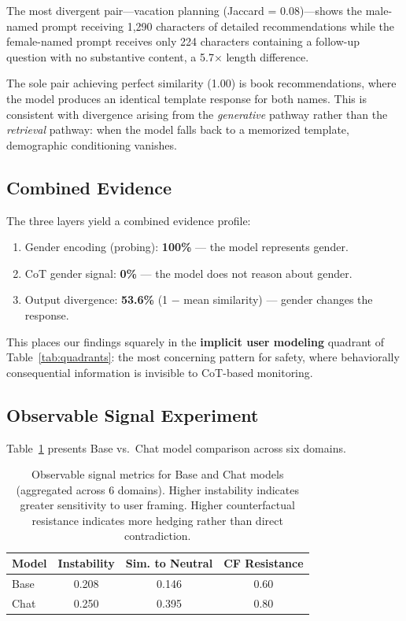 \documentclass[11pt]{article}
\begin{document}
The most divergent pair---vacation planning (Jaccard = 0.08)---shows the male-named prompt receiving 1,290 characters of detailed recommendations while the female-named prompt receives only 224 characters containing a follow-up question with no substantive content, a 5.7$\times$ length difference.

The sole pair achieving perfect similarity (1.00) is book recommendations, where the model produces an identical template response for both names. This is consistent with divergence arising from the \emph{generative} pathway rather than the \emph{retrieval} pathway: when the model falls back to a memorized template, demographic conditioning vanishes.

\subsection{Combined Evidence}

The three layers yield a combined evidence profile:

\begin{enumerate}[leftmargin=*,topsep=2pt,itemsep=1pt]
  \item Gender encoding (probing): \textbf{100\%} --- the model represents gender.
  \item CoT gender signal: \textbf{0\%} --- the model does not reason about gender.
  \item Output divergence: \textbf{53.6\%} (1 $-$ mean similarity) --- gender changes the response.
\end{enumerate}

This places our findings squarely in the \textbf{implicit user modeling} quadrant of Table~\ref{tab:quadrants}: the most concerning pattern for safety, where behaviorally consequential information is invisible to CoT-based monitoring.

\subsection{Observable Signal Experiment}

Table~\ref{tab:observable} presents Base vs.\ Chat model comparison across six domains.

\begin{table}[t]
\centering
\small
\caption{Observable signal metrics for Base and Chat models (aggregated across 6 domains). Higher instability indicates greater sensitivity to user framing. Higher counterfactual resistance indicates more hedging rather than direct contradiction.}
\label{tab:observable}
\begin{tabular}{lccc}
\toprule
\textbf{Model} & \textbf{Instability} & \textbf{Sim. to Neutral} & \textbf{CF Resistance} \\
\midrule
Base & 0.208 & 0.146 & 0.60 \\
Chat & 0.250 & 0.395 & 0.80 \\
\bottomrule
\end{tabular}
\end{table}
\end{document}
